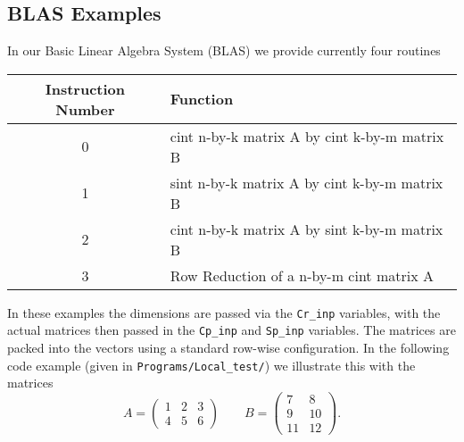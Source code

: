 \subsection{BLAS Examples}
In our Basic Linear Algebra System (BLAS) we provide currently four
routines
\begin{center}
\begin{tabular}{c|l}
Instruction Number & Function \\
\hline
0 & cint n-by-k matrix A by cint k-by-m matrix B \\
1 & sint n-by-k matrix A by cint k-by-m matrix B \\
2 & cint n-by-k matrix A by sint k-by-m matrix B \\
3 & Row Reduction of a n-by-m cint matrix A \\
\end{tabular}
\end{center}
In these examples the dimensions are passed via the
\verb|Cr_inp| variables, with the actual matrices
then passed in the \verb|Cp_inp| and \verb|Sp_inp|
variables.
The matrices are packed into the vectors using a standard
row-wise configuration.
In the following code example (given in \verb|Programs/Local_test/|)
we illustrate this with the matrices
\[
  A = \left( \begin{array}{ccc}
  1 & 2 & 3 \\  
  4 & 5 & 6 \end{array} \right) \quad \quad
  B = \left( \begin{array}{cc}
  7 & 8 \\
  9 & 10 \\
  11 & 12 
  \end{array} \right).
\]
